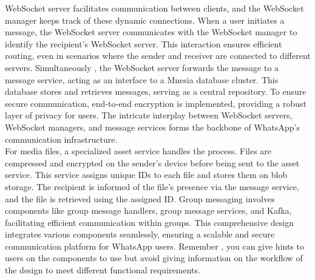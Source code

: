 WebSocket server facilitates communication between clients, and the WebSocket manager keeps track of these dynamic connections. When a user initiates a message, the WebSocket server communicates with the WebSocket manager to identify the recipient's WebSocket server. This interaction ensures efficient routing, even in scenarios where the sender and receiver are connected to different servers. Simultaneously , the WebSocket server forwards the message to a message service, acting as an interface to a Mnesia database cluster. This database stores and retrieves messages, serving as a central repository. To ensure secure communication, end-to-end encryption is implemented, providing a robust layer of privacy for users. The intricate interplay between WebSocket servers, WebSocket managers, and message services forms the backbone of WhatsApp's communication infrastructure.
\\
For media files, a specialized asset service handles the process. Files are compressed and encrypted on the sender's device before being sent to the asset service. This service assigns unique IDs to each file and stores them on blob storage. The recipient is informed of the file's presence via the message service, and the file is retrieved using the assigned ID. Group messaging involves components like group message handlers, group message services, and Kafka, facilitating efficient communication within groups. This comprehensive design integrates various components seamlessly, ensuring a scalable and secure communication platform for WhatsApp users. Remember , you can give hints to users on the components to use but avoid giving information on the workflow of the design to meet different functional requirements.

